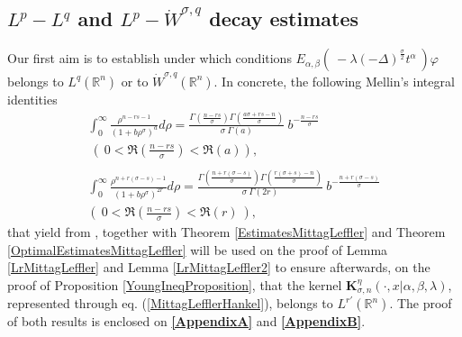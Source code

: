 \documentclass{amsart}
\theoremstyle{definition}
\theoremstyle{remark}
\numberwithin{equation}{section}
\newcommand{\BR}{{\mathbb R}}
\begin{document}
\subsection{$L^p-L^q$ and $L^p-\dot{W}^{\sigma,q}$ decay estimates}\label{LpLqEstimates}
Our first aim is to establish under which conditions $E_{\alpha,\beta}\left(~-\lambda(-\Delta)^{\frac{\sigma}{2}} t^\alpha~\right)\varphi$ belongs to $L^q(\BR^n)$ or to $\dot{W}^{\sigma,q}(\BR^n)$.
In concrete, the following Mellin's integral identities
\begin{eqnarray}
	\label{MellinId}
	\displaystyle \int_{0}^\infty \frac{\rho^{n-rs-1}}{(1+b\rho^\sigma)^a}d\rho = \frac{\Gamma\left(\frac{ n-rs}{\sigma}\right)\Gamma\left(\frac{a\sigma+rs-n}{\sigma}\right)}{\sigma~\Gamma(a)}~b^{-\frac{n-rs}{\sigma}}\\ ~\displaystyle \left(~0<\Re\left(\frac{n-rs}{\sigma}\right)<\Re(a)\right),~\nonumber
	\\ \nonumber \\
	\label{MellinId2} 		\displaystyle \int_{0}^\infty \frac{\rho^{ n+r(\sigma-s)-1}}{(1+b\rho^\sigma)^{2r}}d\rho
	= \frac{\Gamma\left(\frac{n+r(\sigma-s)
		}{\sigma}\right)\Gamma\left(\frac{r(\sigma+s)-n}{\sigma}\right)}{\sigma~\Gamma(2r)}~b^{-\frac{n+r(\sigma-s)}{\sigma}}\\ \displaystyle \left(~0<\Re\left(\frac{n-rs}{\sigma}\right)<\Re(r)~\right),\nonumber
\end{eqnarray}
that yield from \cite[eq.~(1.4.65) of p.~24]{KST06}, together with Theorem \ref{EstimatesMittagLeffler} and Theorem \ref{OptimalEstimatesMittagLeffler} will be used on the proof of Lemma \ref{LrMittagLeffler} and Lemma \ref{LrMittagLeffler2} to ensure afterwards, on the proof of Proposition \ref{YoungIneqProposition}, that the kernel ${\bm K}_{\sigma,n}^\eta(\cdot,x|\alpha,\beta,\lambda)$, represented through eq. (\ref{MittagLefflerHankel}), belongs to $L^{r'}(\BR^n)$. The proof of both results is {enclosed on {\bf \ref{AppendixA}} and {\bf \ref{AppendixB}}}.
\end{document}
